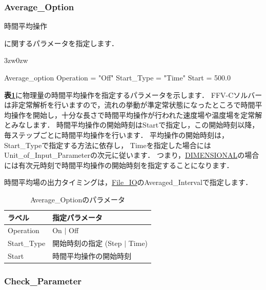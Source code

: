 \pagebreak
\subsubsection{Average\_Option}

\hypertarget{tgt:average_option}{時間平均操作}に関するパラメータを指定します．

\begin{indentation}{3zw}{0zw}

{\small
\begin{program}
  Average_option {
    Operation  = "Off"
    Start_Type = "Time"
    Start      = 500.0
  }
\end{program}
}

\textbf{表\ref{tbl:averaging}}に物理量の時間平均操作を指定するパラメータを示します．
FFV-Cソルバーは非定常解析を行いますので，流れの挙動が準定常状態になったところで時間平均操作を開始し，十分な長さで時間平均操作が行われた速度場や温度場を定常解とみなします．
時間平均操作の開始時刻はStartで指定し，この開始時刻以降，毎ステップごとに時間平均操作を行います．
平均操作の開始時刻は，Start\_Typeで指定する方法に依存し，
Timeを指定した場合にはUnit\_of\_Input\_Parameterの次元に従います．
つまり，\hyperlink{tgt:unit}{DIMENSIONAL}の場合には有次元時刻で時間平均操作の開始時刻を指定することになります．

時間平均場の出力タイミングは，\hyperlink{tgt:fileio}{File\_IO}のAveraged\_Intervalで指定します．


\begin{table}[htdp]
\caption{Average\_Optionのパラメータ}
\begin{center}
\small
\begin{tabular}{ll} \toprule
ラベル & 指定パラメータ\\ \midrule
Operation & On $|$ Off\\
Start\_Type & 開始時刻の指定 (Step $|$ Time)\\
Start & 時間平均操作の開始時刻\\ \bottomrule
\end{tabular}
\end{center}
\label{tbl:averaging}
\end{table}

\end{indentation}



\pagebreak
\subsubsection{Check\_Parameter}


